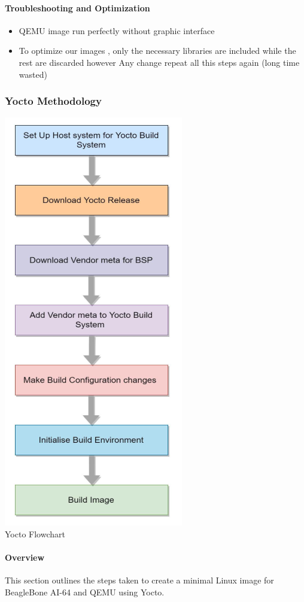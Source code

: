 \paragraph{Troubleshooting and Optimization}
\begin{itemize}
    \item QEMU image run perfectly without graphic interface
    \item To optimize our images , only the necessary libraries are included while the rest are discarded however Any change repeat all this steps again (long time wasted)
\end{itemize}

\subsubsection{Yocto Methodology}

    
    \includegraphics[width=0.4\linewidth]{Images/9_Linux_image/Yocto Flowchart.png}
    \centering \\
    Yocto Flowchart
    \label{fig:enter-label}
\\
\raggedright
\paragraph{Overview}
This section outlines the steps taken to create a minimal Linux image for BeagleBone AI-64 and QEMU using Yocto.

